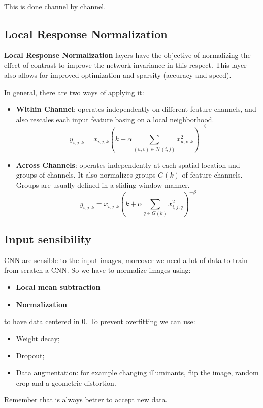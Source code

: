 This is done channel by channel.
\subsection{Local Response Normalization}
\textbf{Local Response Normalization} layers have the objective of normalizing the
effect of contrast to improve the network invariance in this respect. This layer
also allows for improved optimization and sparsity (accuracy and speed).

In general, there are two ways of applying it:
\begin{itemize}
    \item \textbf{Within Channel}: operates independently on different feature
          channels, and also rescales each input feature basing on a local
          neighborhood.
          \begin{equation}
              y_{i, j, k} = x_{i, j, k} \left(k + \alpha \sum_{(u, v) \in \mathcal{N}(i, j)} x_{u, v, k}^2 \right)^{-\beta}
          \end{equation}
    \item \textbf{Across Channels}: operates independently at each spatial location
          and groups of channels. It also normalizes groups $G(k)$ of feature
          channels. Groups are usually defined in a sliding window manner.
          \begin{equation}
              y_{i, j, k} = x_{i, j, k} \left(k + \alpha \sum_{q \in G(k)} x_{i, j, q}^2 \right)^{-\beta}
          \end{equation}
\end{itemize}

\subsection{Input sensibility}
CNN are sensible to the input images, moreover we need a lot of data to train
from scratch a CNN. So we have to normalize images using:
\begin{itemize}
    \item \textbf{Local mean subtraction}
    \item \textbf{Normalization}
\end{itemize}
to have data centered in 0. To prevent overfitting we can use:
\begin{itemize}
    \item Weight decay;
    \item Dropout;
    \item Data augmentation: for example changing illuminants, flip the image,
          random crop and a geometric distortion.
\end{itemize}
Remember that is always better to accept new data.

